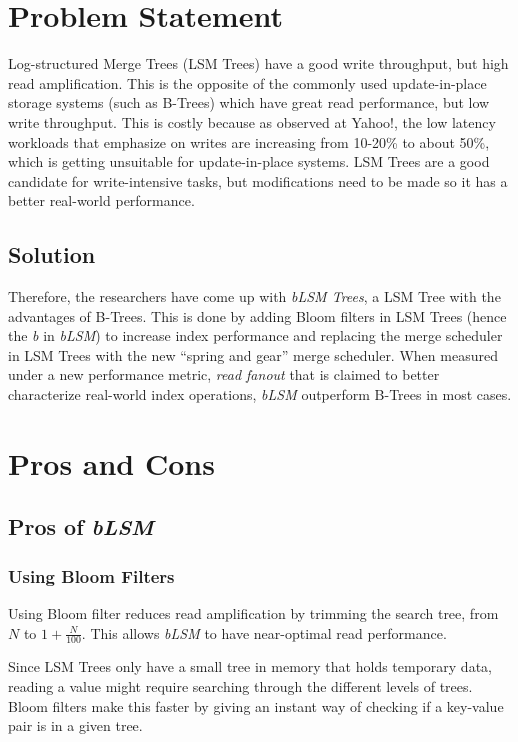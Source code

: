 \documentclass{article}
\title{\mytitle}
\author{\myname}
\date{\today}
\theoremstyle{plain}
\begin{document}
\maketitle
\section{Problem Statement}

\cite{10.1145/2213836.2213862} Log-structured Merge Trees (LSM Trees) have a
good write throughput, but high read amplification. This is the opposite of the
commonly used update-in-place storage systems (such as B-Trees) which have great
read performance, but low write throughput. This is costly because as observed
at Yahoo!, the low latency workloads that emphasize on writes are increasing
from 10-20\% to about 50\%, which is getting unsuitable for update-in-place
systems. LSM Trees are a good candidate for write-intensive tasks, but
modifications need to be made so it has a better real-world performance.

\subsection{Solution}
Therefore, the researchers have come up with \emph{bLSM Trees}, a LSM Tree with the
advantages of B-Trees. This is done by adding Bloom filters in LSM Trees (hence
the \emph{b} in \emph{bLSM}) to increase index performance and replacing the
merge scheduler in LSM Trees with the new ``spring and gear'' merge scheduler.
When measured under a new performance metric, \emph{read fanout} that is claimed
to better characterize real-world index operations, \emph{bLSM} outperform
B-Trees in most cases.

\section{Pros and Cons}
\subsection{Pros of \emph{bLSM}}
\subsubsection{Using Bloom Filters}
Using Bloom filter reduces read amplification by trimming the search tree,
from $N$ to $1 + \frac{N}{100}$. This allows \emph{bLSM} to have near-optimal
read performance.

\medskip
Since LSM Trees only have a small tree in memory that holds temporary data, reading
a value might require searching through the different levels of trees. Bloom
filters make this faster by giving an instant way of checking if a key-value
pair is in a given tree.
\end{document}
